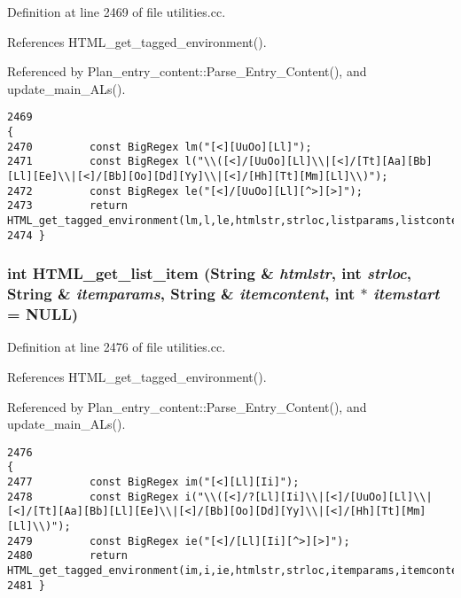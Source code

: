 Definition at line 2469 of file utilities.cc.

References HTML\_\-get\_\-tagged\_\-environment().

Referenced by Plan\_\-entry\_\-content::Parse\_\-Entry\_\-Content(), and update\_\-main\_\-ALs().



\footnotesize\begin{verbatim}2469                                                                                                                    {
2470         const BigRegex lm("[<][UuOo][Ll]");
2471         const BigRegex l("\\([<]/[UuOo][Ll]\\|[<]/[Tt][Aa][Bb][Ll][Ee]\\|[<]/[Bb][Oo][Dd][Yy]\\|[<]/[Hh][Tt][Mm][Ll]\\)");
2472         const BigRegex le("[<]/[UuOo][Ll][^>][>]"); 
2473         return HTML_get_tagged_environment(lm,l,le,htmlstr,strloc,listparams,listcontent,liststart);
2474 }
\end{verbatim}\normalsize 
{}
\subsubsection{\setlength{\rightskip}{0pt plus 5cm}int HTML\_\-get\_\-list\_\-item ({\bf String} \& {\em htmlstr}, int {\em strloc}, {\bf String} \& {\em itemparams}, {\bf String} \& {\em itemcontent}, int $\ast$ {\em itemstart} = NULL)}\label{dil2al_8hh_a256}




Definition at line 2476 of file utilities.cc.

References HTML\_\-get\_\-tagged\_\-environment().

Referenced by Plan\_\-entry\_\-content::Parse\_\-Entry\_\-Content(), and update\_\-main\_\-ALs().



\footnotesize\begin{verbatim}2476                                                                                                                         {
2477         const BigRegex im("[<][Ll][Ii]");
2478         const BigRegex i("\\([<]/?[Ll][Ii]\\|[<]/[UuOo][Ll]\\|[<]/[Tt][Aa][Bb][Ll][Ee]\\|[<]/[Bb][Oo][Dd][Yy]\\|[<]/[Hh][Tt][Mm][Ll]\\)");
2479         const BigRegex ie("[<]/[Ll][Ii][^>][>]");
2480         return HTML_get_tagged_environment(im,i,ie,htmlstr,strloc,itemparams,itemcontent,itemstart);
2481 }
\end{verbatim}\normalsize 
{}
